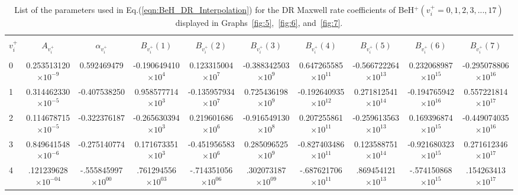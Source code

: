 \documentclass[reviewcopy]{elsarticle}
\begin{document}
\begin{landscape}
\renewcommand{\thefootnote}{\fnsymbol{footnote}}
\renewcommand{\arraystretch}{0.81}
\scriptsize
\begin{longtable}{lccccccccc}
\caption[table1]{List of the parameters used in Eq.(\ref{eqn:BeH_DR_Interpolation}) for the DR Maxwell rate coefficients of BeH$^+(v_{i}^{+}=0,1,2,3,...,17)$ displayed in Graphs~\ref{fig:5},~\ref{fig:6}, and~\ref{fig:7}.}
\label{tab:BeH_DR_Interpolation}\vspace{0.5cm}\\
\hline \\[-2ex]
   \multicolumn{1}{c}{$v^+_i$} &
   \multicolumn{1}{c}{$A_{v^+_i}$} &
   \multicolumn{1}{c}{$\alpha_{v^+_i}$} &
   \multicolumn{1}{c}{$B_{v^+_i}(1)$} &
   \multicolumn{1}{c}{$B_{v^+_i}(2)$} &
   \multicolumn{1}{c}{$B_{v^+_i}(3)$} &
   \multicolumn{1}{c}{$B_{v^+_i}(4)$}  &
   \multicolumn{1}{c}{$B_{v^+_i}(5)$} &
   \multicolumn{1}{c}{$B_{v^+_i}(6)$} &
   \multicolumn{1}{c}{$B_{v^+_i}(7)$} \\[5pt]
 \hline \\[-2ex]
\endhead
    0   &  0.253513120$\times10^{-9}$ &   0.592469479 & -0.190649410$\times10^{4}$ &  0.123315004$\times10^{7}$  & -0.388342503$\times10^{9}$ & 0.647265585$\times10^{11}$   & -0.566722264$\times10^{13}$ & 0.232068987$\times10^{15}$  & -0.295078806$\times10^{16}$ \\
    1   &  0.314462330$\times10^{-5}$ &  -0.407538250 & 0.958577714$\times10^{3}$  &  -0.135957934$\times10^{7}$ & 0.725436198$\times10^{9}$  & -0.192640935$\times10^{12}$  & 0.271812541$\times10^{14}$  & -0.194765942$\times10^{16}$ & 0.557221814$\times10^{17}$ \\
    2   &  0.114678715$\times10^{-5}$ &  -0.322376187 & -0.265630394$\times10^{3}$ &  0.219601686$\times10^{6}$  & -0.916549130$\times10^{8}$ & 0.207255861$\times10^{11}$   & -0.259613563$\times10^{13}$ & 0.169396874$\times10^{15}$  & -0.449074035$\times10^{16}$ \\
		3   &  0.849641548$\times10^{-6}$ &  -0.275140774 & 0.171673351$\times10^{3}$  &  -0.451956583$\times10^{6}$ & 0.285096525$\times10^{9}$  &  -0.827403486$\times10^{11}$ & 0.123588751$\times10^{14}$  & -0.921680323$\times10^{15}$ & 0.271612346$\times10^{17}$ \\
4   &  .121239628$\times10^{-04}$ &  -.555845997$\times10^{00}$ & .761294556$\times10^{03}$  &  -.714351056$\times10^{06}$ & .302073187$\times10^{09}$  &  -.687621706$\times10^{11}$ & .869454121$\times10^{13}$  &  -.574150868$\times10^{15}$ & .154263413$\times10^{17}$  \\

\end{longtable}
\end{landscape}
\end{document}
